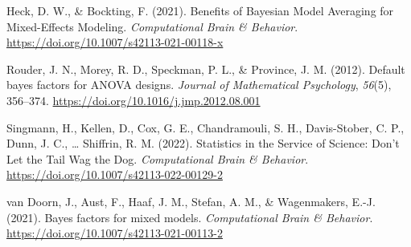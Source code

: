 \documentclass[
  man,floatsintext,draftall]{apa6}
\newlength{\cslhangindent}
\newlength{\cslentryspacingunit} %
\newenvironment{CSLReferences}[2] %
 {%
  \setlength{\parindent}{0pt}
  \ifodd #1
  \let\oldpar\par
  \def\par{\hangindent=\cslhangindent\oldpar}
  \fi
  \setlength{\parskip}{#2\cslentryspacingunit}
 }%
 {}
\begin{document}
\hypertarget{refs}{}
\begin{CSLReferences}{1}{0}
\leavevmode{}%
Heck, D. W., \& Bockting, F. (2021). Benefits of {Bayesian Model Averaging} for {Mixed-Effects Modeling}. \emph{Computational Brain \& Behavior}. \url{https://doi.org/10.1007/s42113-021-00118-x}

\leavevmode{}%
Rouder, J. N., Morey, R. D., Speckman, P. L., \& Province, J. M. (2012). Default bayes factors for ANOVA designs. \emph{Journal of Mathematical Psychology}, \emph{56}(5), 356--374. \url{https://doi.org/10.1016/j.jmp.2012.08.001}

\leavevmode{}%
Singmann, H., Kellen, D., Cox, G. E., Chandramouli, S. H., Davis-Stober, C. P., Dunn, J. C., \ldots{} Shiffrin, R. M. (2022). Statistics in the {Service} of {Science}: {Don}'t {Let} the {Tail Wag} the {Dog}. \emph{Computational Brain \& Behavior}. \url{https://doi.org/10.1007/s42113-022-00129-2}

\leavevmode{}%
van Doorn, J., Aust, F., Haaf, J. M., Stefan, A. M., \& Wagenmakers, E.-J. (2021). Bayes factors for mixed models. \emph{Computational Brain \& Behavior}. \url{https://doi.org/10.1007/s42113-021-00113-2}

\end{CSLReferences}
\end{document}
